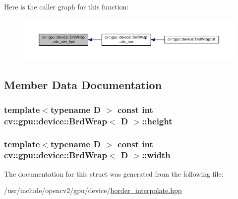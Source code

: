 Here is the caller graph for this function\-:\nopagebreak
\begin{figure}[H]
\begin{center}
\leavevmode
\includegraphics[width=350pt]{structcv_1_1gpu_1_1device_1_1BrdWrap_ae8fd429e1ba5cda540a9fe7d13d06e1a_icgraph}
\end{center}
\end{figure}




\subsection{Member Data Documentation}
\hypertarget{structcv_1_1gpu_1_1device_1_1BrdWrap_abd7d1a117067e85f12317cc3309e63e8}{
\subsubsection[{height}]{\setlength{\rightskip}{0pt plus 5cm}template$<$typename D $>$ const int {\bf cv\-::gpu\-::device\-::\-Brd\-Wrap}$<$ D $>$\-::height}}\label{structcv_1_1gpu_1_1device_1_1BrdWrap_abd7d1a117067e85f12317cc3309e63e8}
\hypertarget{structcv_1_1gpu_1_1device_1_1BrdWrap_a9c48b6a8dabfe1729802ba261ebf254d}{
\subsubsection[{width}]{\setlength{\rightskip}{0pt plus 5cm}template$<$typename D $>$ const int {\bf cv\-::gpu\-::device\-::\-Brd\-Wrap}$<$ D $>$\-::width}}\label{structcv_1_1gpu_1_1device_1_1BrdWrap_a9c48b6a8dabfe1729802ba261ebf254d}


The documentation for this struct was generated from the following file\-:\begin{DoxyCompactItemize}
\item 
/usr/include/opencv2/gpu/device/\hyperlink{border__interpolate_8hpp}{border\-\_\-interpolate.\-hpp}\end{DoxyCompactItemize}

